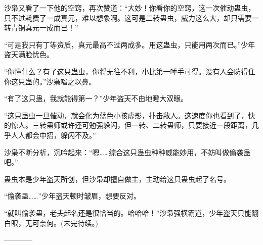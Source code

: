 \begin{this_body}
沙枭又看了一下他的空窍，再次赞道：“大妙！你看你的空窍，这一次催动蛊虫，只不过耗费了一成真元，难以想象啊。这可是二转蛊虫，威力这么大，却只需要一转青铜真元一成而已！”

“可是我只有丁等资质，真元最高不过两成多。用这蛊虫，只能用两次而已。”少年盗天满脸忧色。

“你懂什么？有了这只蛊虫，你将无往不利，小比第一唾手可得。没有人会防得住你这只蛊的。”沙枭嗤之以鼻。

“有了这只蛊，我就能得第一？”少年盗天不由地瞪大双眼。

“这只蛊虫一旦催动，就会化为蓝色小孩虚影，扑击敌人。这速度你也看到了，快的惊人。三转蛊师或许还可勉强躲闪，但一转、二转蛊师，只要接近一段距离，几乎人人都会中招，躲闪不及。”

沙枭不断分析，沉吟起来：“嗯……综合这只蛊虫种种威能妙用，不妨叫做偷袭蛊吧。”

蛊虫本是少年盗天所创，但沙枭却擅自做主，主动给这只蛊虫起了名号。

“偷袭蛊……”少年盗天顿时皱眉，想要反对。

“就叫偷袭蛊，老夫起名还是很恰当的。哈哈哈！”沙枭强横霸道，少年盗天只能翻白眼，无可奈何。(未完待续。)

------------

\end{this_body}


